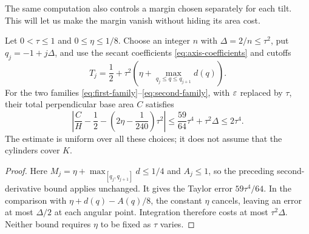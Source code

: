The same computation also controls a margin chosen separately for each
tilt. This will let us make the margin vanish without hiding its area cost.

\begin{corollary}
\label{cor:variable-margin-area}
Let $0<\tau\le1$ and $0\le\eta\le1/8$. Choose an integer $n$ with
$\Delta=2/n\le\tau^2$, put $q_j=-1+j\Delta$, and use the secant
coefficients \eqref{eq:axis-coefficients} and cutoffs
\[
 T_j=\frac12+\tau^2\left(\eta+\max_{q_j\le q\le q_{j+1}}d(q)\right).
\]
For the two families \eqref{eq:first-family}--\eqref{eq:second-family},
with $\varepsilon$ replaced by $\tau$, their total perpendicular base area $C$
satisfies
\begin{equation}\label{eq:variable-margin-area}
 \left|\frac CH-\frac12-
       \left(2\eta-\frac1{240}\right)\tau^2\right|
 \le\frac{59}{64}\tau^4+\tau^2\Delta
 \le2\tau^4.
\end{equation}
The estimate is uniform over all these choices; it does not assume
that the cylinders cover $K$.
\end{corollary}
\begin{proof}
Here $M_j=\eta+\max_{[q_j,q_{j+1}]}d\le1/4$ and $A_j\le1$,
so the preceding second-derivative bound applies unchanged. It gives
the Taylor error $59\tau^4/64$. In the comparison with
$\eta+d(q)-A(q)/8$, the constant $\eta$ cancels, leaving an error
at most $\Delta/2$ at each angular point. Integration therefore costs
at most $\tau^2\Delta$. Neither bound requires $\eta$ to be fixed
as $\tau$ varies.
\end{proof}
